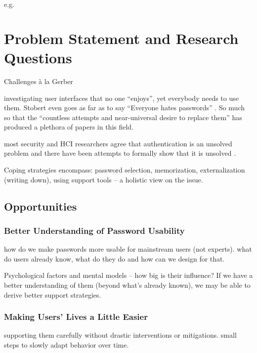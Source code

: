  e.g. \cite{CSID2012PasswordHabits}  

\section{Problem Statement and Research Questions}\label{sec:intro:researchobjectives}

Challenges à la Gerber \etal \cite{Gerber2018HumanFactorsSecurity}

investigating user interfaces that no one ``enjoys'', yet everybody needs to use them. Stobert even goes as far as to say ``Everyone hates passwords'' \cite{Stobert2014Agony}. So much so that the ``countless attempts and near-universal desire to replace them''  \cite{Herley2012PersistenceOfPasswords} has produced a plethora of papers in this field.

most security and HCI researchers agree that authentication is an unsolved problem and there have been attempts to formally show that it is unsolved \cite{Bonneau2012ReplacePasswords, Bonneau2015ImperfectAuthentication, Herley2012PersistenceOfPasswords}. 


Coping strategies encompass: password selection, memorization, externalization (writing down), using support tools -- a holistic view on the issue. 

\subsection{Opportunities}

\subsubsection{Better Understanding of Password Usability}
how do we make passwords more usable for mainstream users (not experts). what do users already know, what do they do and how can we design for that. 

Psychological factors and mental models -- how big is their influence? If we have a better understanding of them (beyond what's already known), we may be able to derive better support strategies.

\subsubsection{Making Users' Lives a Little Easier}
supporting them carefully without drastic interventions or mitigations. small steps to slowly adapt behavior over time. 

